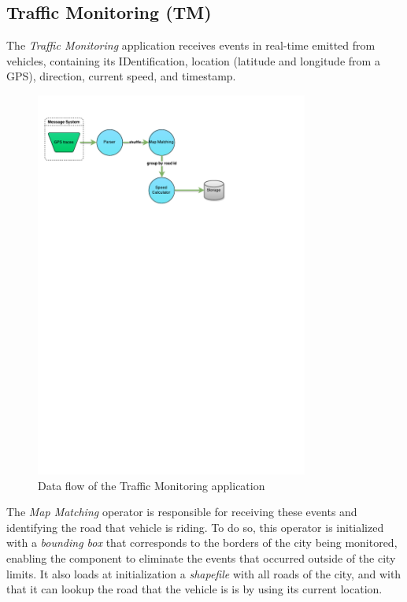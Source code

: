 \documentclass[ppgc,diss,english]{iiufrgs}
\begin{document}
\subsection{Traffic Monitoring (TM)}

The \emph{Traffic Monitoring} application receives events in real-time emitted from vehicles, containing its IDentification, location (latitude and longitude from a GPS), direction, current speed, and timestamp.

\begin{figure}[!ht]
	\centering
	\includegraphics[width=0.8\textwidth]{images/apps/TrafficMonitoring.pdf}
	\caption{Data flow of the Traffic Monitoring application}
	\label{fig:app_traffic_monitoring}
\end{figure}

The \emph{Map Matching} operator is responsible for receiving these events and identifying the road that vehicle is riding. To do so, this operator is initialized with a \emph{bounding box} that corresponds to the borders of the city being monitored, enabling the component to eliminate the events that occurred outside of the city limits. It also loads at initialization a \emph{shapefile} with all roads of the city, and with that it can lookup the road that the vehicle is is by using its current location.
\end{document}
